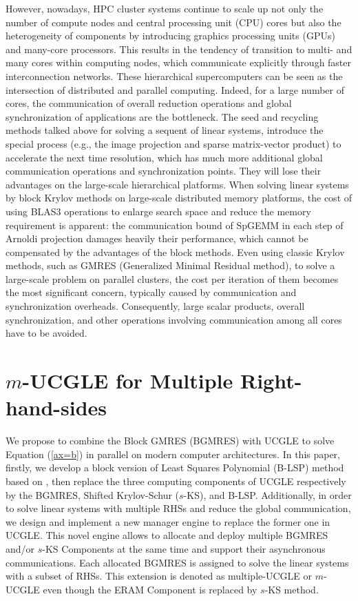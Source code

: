 However, nowadays, HPC cluster systems continue to scale up not only the number of compute nodes and central processing unit (CPU) cores but also the heterogeneity of components by introducing graphics processing units (GPUs) and many-core processors. This results in the tendency of transition to multi- and many cores within computing nodes, which communicate explicitly through faster interconnection networks. These hierarchical supercomputers can be seen as the intersection of distributed and parallel computing. Indeed, for a large number of cores, the communication of overall reduction operations and global synchronization of applications are the bottleneck. The seed and recycling methods talked above for solving a sequent of linear systems, introduce the special process (e.g., the image projection and sparse matrix-vector product) to accelerate the next time resolution, which has much more additional global communication operations and synchronization points. They will lose their advantages on the large-scale hierarchical platforms. When solving linear systems by block Krylov methods on large-scale distributed memory platforms, the cost of using BLAS3 operations to enlarge search space and reduce the memory requirement is apparent: the communication bound of SpGEMM in each step of Arnoldi projection damages heavily their performance, which cannot be compensated by the advantages of the block methods. Even using classic Krylov methods, such as GMRES (Generalized Minimal Residual method), to solve a large-scale problem on parallel clusters, the cost per iteration of them becomes the most significant concern, typically caused by communication and synchronization overheads. Consequently, large scalar products, overall synchronization, and other operations involving communication among all cores have to be avoided. 


\section{$m$-UCGLE for Multiple Right-hand-sides}

We propose to combine the Block GMRES (BGMRES) \cite{vital1990etude} with UCGLE \cite{wu2018distributed} to solve Equation (\ref{ax=b}) in parallel on modern computer architectures. In this paper, firstly, we develop a block version of Least Squares Polynomial (B-LSP) method based on \cite{saad1987least}, then replace the three computing components of UCGLE respectively by the BGMRES, Shifted Krylov-Schur ($s$-KS), and B-LSP. Additionally, in order to solve linear systems with multiple RHSs and reduce the global communication, we design and implement a new manager engine to replace the former one in UCGLE. This novel engine allows to allocate and deploy multiple BGMRES and/or $s$-KS Components at the same time and support their asynchronous communications. Each allocated BGMRES is assigned to solve the linear systems with a subset of RHSs. This extension is denoted as multiple-UCGLE or $m$-UCGLE even though the ERAM Component is replaced by $s$-KS method. 

